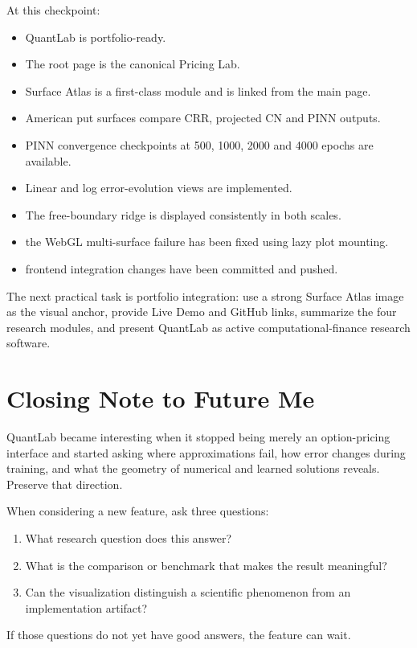 \documentclass[11pt,a4paper]{article}
\begin{document}
At this checkpoint:

\begin{itemize}[leftmargin=2em]
\item QuantLab is portfolio-ready.
\item The root page is the canonical Pricing Lab.
\item Surface Atlas is a first-class module and is linked from the main page.
\item American put surfaces compare CRR, projected CN and PINN outputs.
\item PINN convergence checkpoints at 500, 1000, 2000 and 4000 epochs are available.
\item Linear and log error-evolution views are implemented.
\item The free-boundary ridge is displayed consistently in both scales.
\item the WebGL multi-surface failure has been fixed using lazy plot mounting.
\item frontend integration changes have been committed and pushed.
\end{itemize}

The next practical task is portfolio integration: use a strong Surface Atlas image as the visual anchor, provide Live Demo and GitHub links, summarize the four research modules, and present QuantLab as active computational-finance research software.

\section{Closing Note to Future Me}

QuantLab became interesting when it stopped being merely an option-pricing interface and started asking where approximations fail, how error changes during training, and what the geometry of numerical and learned solutions reveals. Preserve that direction.

When considering a new feature, ask three questions:

\begin{enumerate}[leftmargin=2em]
\item What research question does this answer?
\item What is the comparison or benchmark that makes the result meaningful?
\item Can the visualization distinguish a scientific phenomenon from an implementation artifact?
\end{enumerate}

If those questions do not yet have good answers, the feature can wait.
\end{document}
